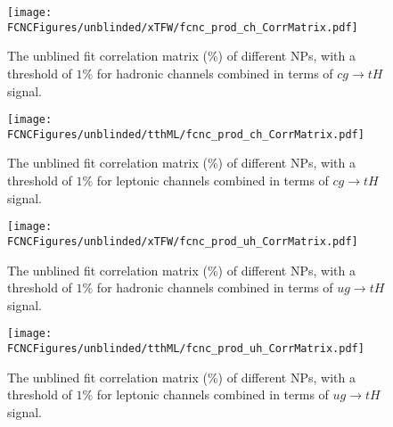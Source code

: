\begin{figure}[H]
\centering
\texttt{[image: \\FCNCFigures/unblinded/xTFW/fcnc\_prod\_ch\_CorrMatrix.pdf]}
\caption{ The unblined fit correlation matrix ($\%$) of different NPs, with a threshold of $1\%$ for hadronic channels combined in terms of $cg\to tH$ signal.}
\label{fig:fcnc_prod_ch_CorrMatrix_1}
\end{figure}



\begin{figure}[H]
\centering
\texttt{[image: \\FCNCFigures/unblinded/tthML/fcnc\_prod\_ch\_CorrMatrix.pdf]}
\caption{ The unblined fit correlation matrix ($\%$) of different NPs, with a threshold of $1\%$ for leptonic channels combined in terms of $cg\to tH$ signal.}
\label{fig:fcnc_prod_ch_CorrMatrix_2}
\end{figure}

\begin{figure}[H]
\centering
\texttt{[image: \\FCNCFigures/unblinded/xTFW/fcnc\_prod\_uh\_CorrMatrix.pdf]}
\caption{ The unblined fit correlation matrix ($\%$) of different NPs, with a threshold of $1\%$ for hadronic channels combined in terms of $ug\to tH$ signal.}
\label{fig:fcnc_prod_uh_CorrMatrix_1}
\end{figure}

\begin{figure}[H]
\centering
\texttt{[image: \\FCNCFigures/unblinded/tthML/fcnc\_prod\_uh\_CorrMatrix.pdf]}
\caption{ The unblined fit correlation matrix ($\%$) of different NPs, with a threshold of $1\%$ for leptonic channels combined in terms of $ug\to tH$ signal.}
\label{fig:fcnc_prod_uh_CorrMatrix_2}
\end{figure}











\newpage
